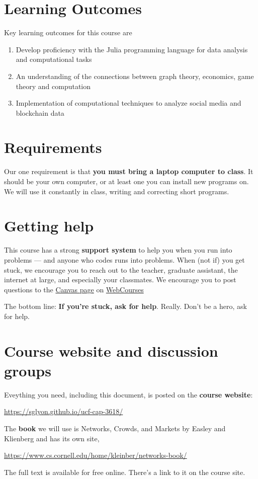 \documentclass[11pt]{article}
\begin{document}
\section*{Learning Outcomes}

Key learning outcomes for this course are

\begin{enumerate}
    \item Develop proficiency with the Julia programming language for data
    analysis and computational tasks
    \item An understanding of the connections between graph theory, economics,
    game theory and computation
    \item Implementation of computational techniques to analyze social media and
    blockchain data
\end{enumerate}


\section*{Requirements}

Our one requirement is that {\bf you must bring a laptop computer to class\/}.
It should be your own computer, or at least one you can install new programs on.
We will use it constantly in class, writing and correcting short programs.

\section*{Getting help}

This course has a strong {\bf support system\/} to help you when you run into
problems --- and anyone who codes runs into problems. When (not if) you get
stuck, we encourage you to reach out to the teacher, graduate assistant, the
internet at large, and especially your classmates. We encourage you to post
questions to the \href{https://webcourses.ucf.edu/courses/1392110}{Canvas page}
on \href{https://webcourses.ucf.edu}{WebCourses}

The bottom line:  {\bf If you're stuck, ask for help\/}.
Really.  Don't be a hero, ask for help.

\section*{Course website and discussion groups}

Eveything you need, including this document, is posted on
the {\bf course website\/}:
%
\vspace{-0.15in}
\begin{center}
\url{https://sglyon.github.io/ucf-cap-3618/}
\end{center}
\vspace{-0.15in}
%
The {\bf book\/} we will use is Networks, Crowds, and Markets by Easley and Klienberg and has its own site,
%
\vspace{-0.15in}
\begin{center}
\url{https://www.cs.cornell.edu/home/kleinber/networks-book/}
\end{center}
\vspace{-0.15in}
%
The full text is available for free online. There's a link to it on the course site.
\end{document}
